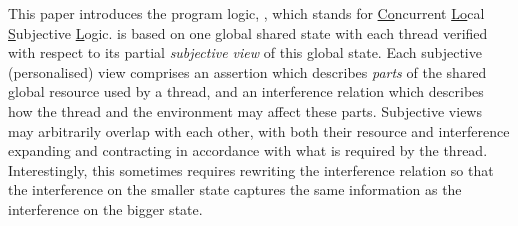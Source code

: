 


This paper introduces the program logic, \colosl, which stands for 
\underline{Co}ncurrent \underline{Lo}cal \underline{S}ubjective
\underline{L}ogic. \colosl is based on one global shared state with
each thread verified with respect to its partial {\em subjective view}
of this global state. Each subjective (personalised) view comprises an assertion which
describes  \emph{parts} of the shared global resource used by a thread, 
and an interference relation which describes   how the thread and
the environment may affect these parts.  
Subjective views may arbitrarily overlap with
each other, with both their resource and interference expanding and
contracting  in accordance with what is required by the
thread. Interestingly, this
sometimes requires rewriting  the  interference relation so that 
the interference on the smaller state captures the same 
information as the interference on the bigger state. 




